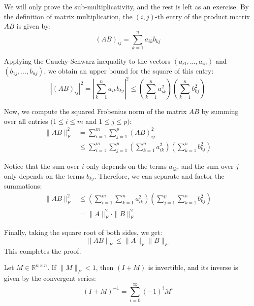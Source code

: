 \begin{pfbox}
We will only prove the sub-multiplicativity, and the rest is left as an exercise.
By the definition of matrix multiplication, the $(i, j)$-th entry of the product matrix $AB$ is given by:
$$(AB)_{ij} = \sum_{k=1}^n a_{ik} b_{kj}$$

Applying the Cauchy-Schwarz inequality to the vectors $(a_{i1}, \dots, a_{in})$ and $(b_{1j}, \dots, b_{nj})$, we obtain an upper bound for the square of this entry:
$$|(AB)_{ij}|^2 = \left| \sum_{k=1}^n a_{ik} b_{kj} \right|^2 \le \left( \sum_{k=1}^n a_{ik}^2 \right) \left( \sum_{k=1}^n b_{kj}^2 \right)$$

Now, we compute the squared Frobenius norm of the matrix $AB$ by summing over all entries $(1 \le i \le m$ and $1 \le j \le p)$:
\begin{align*}
\|AB\|_F^2 &= \sum_{i=1}^m \sum_{j=1}^p (AB)_{ij}^2 \\
&\le \sum_{i=1}^m \sum_{j=1}^p \left( \sum_{k=1}^n a_{ik}^2 \right) \left( \sum_{k=1}^n b_{kj}^2 \right)
\end{align*}

Notice that the sum over $i$ only depends on the terms $a_{ik}$, and the sum over $j$ only depends on the terms $b_{kj}$. Therefore, we can separate and factor the summations:
\begin{align*}
\|AB\|_F^2 &\le \left( \sum_{i=1}^m \sum_{k=1}^n a_{ik}^2 \right) \left( \sum_{j=1}^p \sum_{k=1}^n b_{kj}^2 \right) \\
&= \|A\|_F^2 \cdot \|B\|_F^2
\end{align*}

Finally, taking the square root of both sides, we get:
$$ \|AB\|_F \le \|A\|_F \|B\|_F $$
This completes the proof.
\end{pfbox}

\begin{theorem}
Let $M \in \mathbb{R}^{n \times n}$. If $\|M\|_F < 1$, then $(I + M)$ is invertible, and its inverse is given by the convergent series:
\[ (I + M)^{-1} = \sum_{i=0}^{\infty} (-1)^i M^i \]
\end{theorem}


